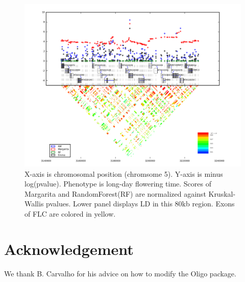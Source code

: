 \documentclass[a4paper,10pt]{article}
\begin{document}
\begin{figure}
  \includegraphics[width=1\textwidth]{figures/phenotype_1_LD_rank_12_snp_5_3188328_list_type_28_FT_list3_gene_830876_AT5G10120.png}
  \caption{X-axis is chromosomal position (chromsome 5). Y-axis is minus log(pvalue). Phenotype is long-day flowering time. Scores of Margarita and RandomForest(RF) are normalized against Kruskal-Wallis pvalues. Lower panel displays LD in this 80kb region. Exons of FLC are colored in yellow.}\label{f8}
\end{figure}



\section{Acknowledgement}
We thank B. Carvalho for his advice on how to modify the Oligo package.




\end{document}

